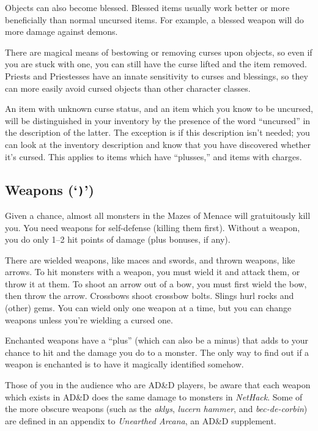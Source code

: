 Objects can also become blessed.  Blessed items usually work better or
more beneficially than normal uncursed items.  For example, a blessed
weapon will do more damage against demons.

There are magical means of bestowing or removing curses upon objects,
so even if you are stuck with one, you can still have the curse
lifted and the item removed.  Priests and Priestesses have an innate
sensitivity to curses and blessings, so they can more easily avoid
cursed objects than other character classes.

An item with unknown curse status, and an item which you know to be uncursed,
will be distinguished in your inventory by the presence of the word
``uncursed'' in the description of the latter.  The exception is if this
description isn't needed; you can look at the inventory description and know
that you have discovered whether it's cursed.  This applies to items which
have ``plusses,'' and items with charges.

\subsection*{Weapons (`{\tt )}')}

Given a chance, almost all monsters in the Mazes of Menace will
gratuitously kill you.  You need weapons for self-defense (killing
them first).  Without a weapon, you do only 1--2 hit points of damage
(plus bonuses, if any).

There are wielded weapons, like maces and swords, and thrown weapons,
like arrows.  To hit monsters with a weapon, you must wield it and
attack them, or throw it at them.  To shoot an arrow out of a bow, you
must first wield the bow, then throw the arrow.  Crossbows shoot
crossbow bolts.  Slings hurl rocks and (other) gems.  You can wield
only one weapon at a time, but you can change weapons unless you're
wielding a cursed one.

Enchanted weapons have a ``plus'' (which can also be a minus)
that adds to your chance
to hit and the damage you do to a monster.  The only way to find out
if a weapon is enchanted is to have it magically identified somehow.

Those of you in the audience who are AD\&D players, be aware that each
weapon which exists in AD\&D does the same damage to monsters in
{\it NetHack}.  Some of the more obscure weapons (such as the %
{\it aklys}, {\it lucern hammer}, and {\it bec-de-corbin\/}) are defined
in an appendix to {\it Unearthed Arcana}, an AD\&D supplement.


